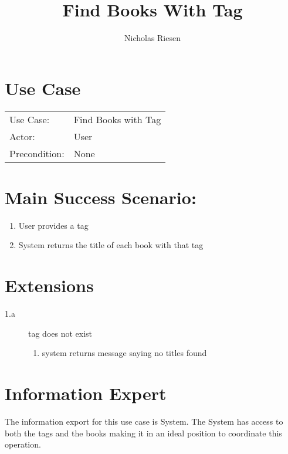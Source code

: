 \documentclass{article}
\title{Find Books With Tag}
\author{Nicholas Riesen}
\begin{document}
\maketitle

\section*{Use Case}
\begin{tabular}{l l}
 
Use Case:     & Find Books with Tag \\
Actor:        & User                \\
Precondition: & None                \\
\end{tabular}

\section*{Main Success Scenario:}
\begin{enumerate}
    \item User provides a tag
    \item System returns the title of each book with that tag
\end{enumerate}

\section*{Extensions}
\begin{description}
    \item[1.a] tag does not exist
    \begin{enumerate}
        \item system returns message saying no titles found
    \end{enumerate}
\end{description}

\section*{Information Expert}
The information export for this use case is System. The System has access to both the tags and the books making it in an ideal position to coordinate this operation. 
\end{document}
